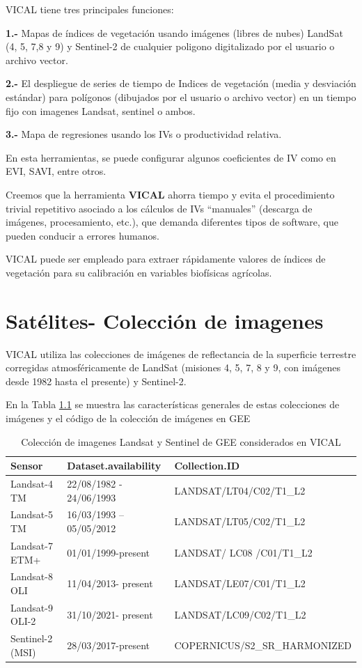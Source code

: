 \documentclass[
]{book}
\begin{document}
VICAL tiene tres principales funciones:

\textbf{1.-} Mapas de índices de vegetación usando imágenes (libres de nubes) LandSat (4, 5, 7,8 y 9) y Sentinel-2 de cualquier poligono digitalizado por el usuario o archivo vector.

\textbf{2.-} El despliegue de series de tiempo de Indices de vegetación (media y desviación estándar) para polígonos (dibujados por el usuario o archivo vector) en un tiempo fijo con imagenes Landsat, sentinel o ambos.

\textbf{3.-} Mapa de regresiones usando los IVs o productividad relativa.

En esta herramientas, se puede configurar algunos coeficientes de IV como en EVI, SAVI, entre otros.

Creemos que la herramienta \textbf{VICAL} ahorra tiempo y evita el procedimiento trivial repetitivo asociado a los cálculos de IVs ``manuales'' (descarga de imágenes, procesamiento, etc.), que demanda diferentes tipos de software, que pueden conducir a errores humanos.

VICAL puede ser empleado para extraer rápidamente valores de índices de vegetación para su calibración en variables biofísicas agrícolas.

\hypertarget{Sat}{%
\chapter{Satélites- Colección de imagenes}\label{Sat}}

VICAL utiliza las colecciones de imágenes de reflectancia de la superficie terrestre corregidas atmosféricamente de LandSat (misiones 4, 5, 7, 8 y 9, con imágenes desde 1982 hasta el presente) y Sentinel-2.

En la Tabla \ref{tab:Sat} se muestra las características generales de estas colecciones de imágenes y el código de la colección de imágenes en GEE

\begin{table}

\caption{\label{tab:Sat}Colección de imagenes Landsat y Sentinel de GEE considerados en VICAL}
\centering
\begin{tabular}[t]{lll}
\toprule
Sensor & Dataset.availability & Collection.ID\\
\midrule
Landsat-4 TM & 22/08/1982 - 24/06/1993 & LANDSAT/LT04/C02/T1\_L2\\
Landsat-5 TM & 16/03/1993 – 05/05/2012 & LANDSAT/LT05/C02/T1\_L2\\
Landsat-7 ETM+ & 01/01/1999-present & LANDSAT/ LC08 /C01/T1\_L2\\
Landsat-8 OLI & 11/04/2013- present & LANDSAT/LE07/C01/T1\_L2\\
Landsat-9 OLI-2 & 31/10/2021- present & LANDSAT/LC09/C02/T1\_L2\\
\addlinespace
Sentinel-2 (MSI) & 28/03/2017-present & COPERNICUS/S2\_SR\_HARMONIZED\\
\bottomrule
\end{tabular}
\end{table}
\end{document}
